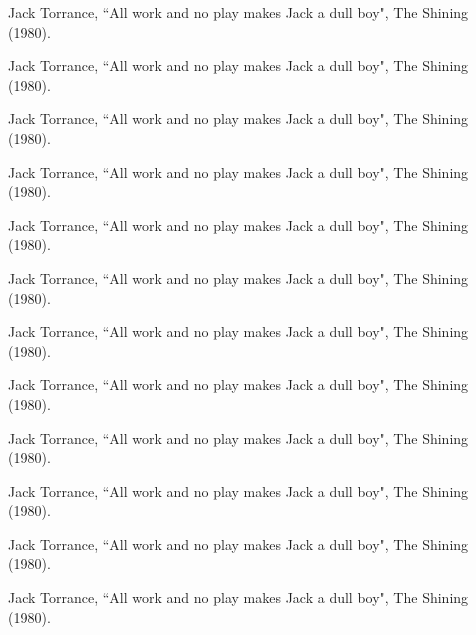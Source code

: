	\item \hspace{15mm}Jack Torrance, ``All work and no play makes Jack a dull boy", The Shining (1980).
	\item \hspace{20mm}Jack Torrance, ``All work and no play makes Jack a dull boy", The Shining (1980).
	\item \hspace{25mm}Jack Torrance, ``All work and no play makes Jack a dull boy", The Shining (1980).
	\item \hspace{30mm}Jack Torrance, ``All work and no play makes Jack a dull boy", The Shining (1980).
	\item \hspace{25mm}Jack Torrance, ``All work and no play makes Jack a dull boy", The Shining (1980).
	\item \hspace{20mm}Jack Torrance, ``All work and no play makes Jack a dull boy", The Shining (1980).
	\item \hspace{15mm}Jack Torrance, ``All work and no play makes Jack a dull boy", The Shining (1980).
	\item \hspace{10mm}Jack Torrance, ``All work and no play makes Jack a dull boy", The Shining (1980).
	\item \hspace{5mm}Jack Torrance, ``All work and no play makes Jack a dull boy", The Shining (1980).
	\item Jack Torrance, ``All work and no play makes Jack a dull boy", The Shining (1980).
	\item \hspace{5mm}Jack Torrance, ``All work and no play makes Jack a dull boy", The Shining (1980).
	\item \hspace{10mm}Jack Torrance, ``All work and no play makes Jack a dull boy", The Shining (1980).
